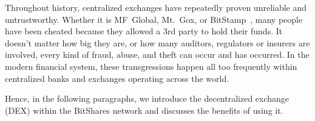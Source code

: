 \label{sec:dex}

Throughout history, centralized exchanges have repeatedly proven unreliable and
untrustworthy. Whether it is MF~Global, Mt.~Gox, or
BitStamp~\cite{mfglobal,mtgox,bitstamp}, many people have been cheated because
they allowed a 3rd party to hold their funds. It doesn't matter how big they
are, or how many auditors, regulators or insurers are involved, every kind of
fraud, abuse, and theft can occur and has occurred. In the modern financial
system, these transgressions happen all too frequently within centralized banks
and exchanges operating across the world.

Hence, in the following paragraphs, we introduce the decentralized exchange
(DEX) within the BitShares network and discusses the benefits of using it.
